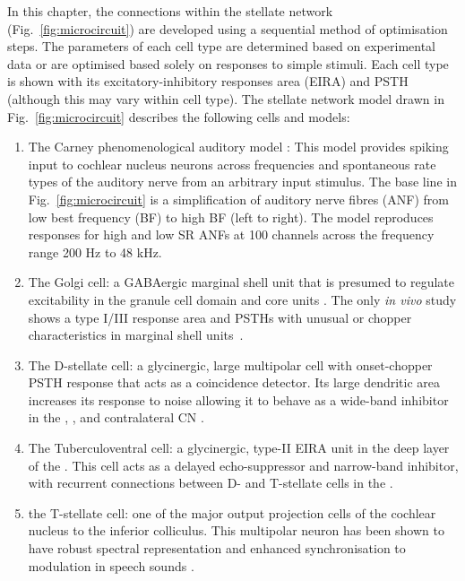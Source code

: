 In this chapter, the connections within the stellate network
(Fig.~\ref{fig:microcircuit}) are developed using a sequential method of
optimisation steps.  The parameters of each cell type are determined based on
experimental data or are optimised based solely on responses to simple stimuli.
Each cell type is shown with its excitatory-inhibitory responses area (EIRA) and
PSTH (although this may vary within cell type).   The stellate network model drawn in
Fig.~\ref{fig:microcircuit} describes the following cells and models:
\begin{enumerate}
\item The Carney phenomenological auditory model
  \citet{ZilanyBruceEtAl:2009}: This model provides spiking input to
  cochlear nucleus neurons across frequencies and spontaneous rate
  types of the auditory nerve from an arbitrary input stimulus. The
  base line in Fig.~\ref{fig:microcircuit} is a simplification of
  auditory nerve fibres (ANF) from low best frequency (BF) to high BF
  (left to right). The model reproduces responses for high and low SR
  ANFs at 100 channels across the frequency range 200 Hz to 48 kHz.
\item The Golgi cell: a GABAergic \VCN marginal shell unit that is presumed to
  regulate excitability in the granule cell domain and core \VCN units
  \citep{FerragamoGoldingEtAl:1998}. The only \textit{in vivo} study shows a type
  I/III response area and PSTHs with unusual or chopper characteristics in
  marginal shell units~\citep{GhoshalKim:1997}.
\item The D-stellate cell: a glycinergic, large multipolar cell with
  onset-chopper PSTH response that acts as a coincidence detector. Its
  large dendritic area increases its response to noise allowing it to
  behave as a wide-band inhibitor in the \VCN, \DCN, and contralateral CN 
  \citep{SmithMassieEtAl:2005,ArnottWallaceEtAl:2004,NeedhamPaolini:2007}.
\item The Tuberculoventral cell: a glycinergic, type-II EIRA unit in the deep
  layer of the \DCN \citep{SpirouDavisEtAl:1999}.  This cell acts as a delayed
  echo-suppressor and narrow-band inhibitor, with recurrent connections between
  D- and T-stellate cells in the \VCN
  \citep{Alibardi:2006,OertelWickesberg:1993,WickesbergWhitlonEtAl:1991}.
\item the T-stellate cell: one of the major output projection cells of the
  cochlear nucleus to the inferior colliculus. This multipolar neuron has been
  shown to have robust spectral representation and enhanced synchronisation to
  modulation in speech sounds
  \citep{BlackburnSachs:1990,KeilsonRichardsEtAl:1997}.
\end{enumerate}

